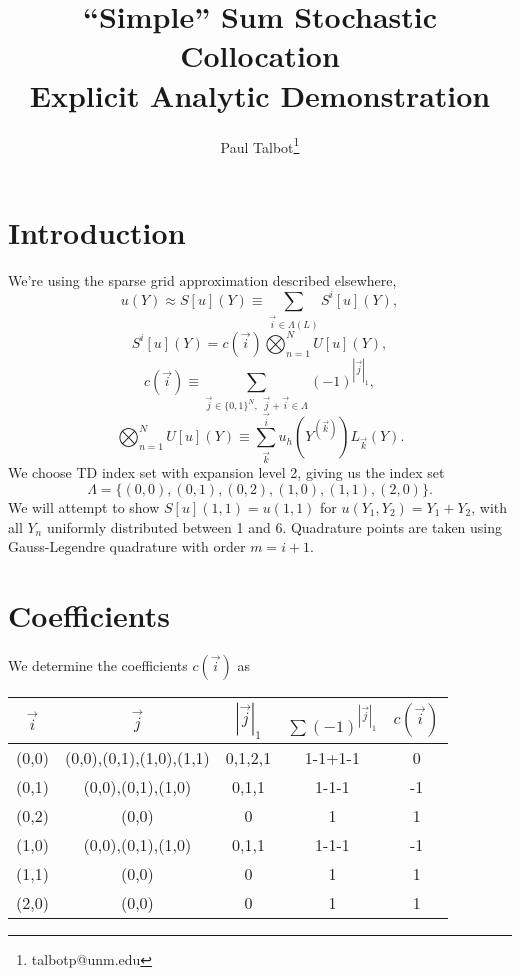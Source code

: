 \documentclass[11pt]{article}
\begin{document}
\title{``Simple'' Sum Stochastic Collocation \\Explicit Analytic Demonstration}

\author[]{Paul Talbot\thanks{talbotp@unm.edu}}
\renewcommand\Authands{ and }
\maketitle
\newpage
\section{Introduction}
We're using the sparse grid approximation described elsewhere,
\begin{equation}
u(Y)\approx S[u](Y)\equiv \sum_{\vec i\in\Lambda(L)} S^i[u](Y),
\end{equation}
\begin{equation}
 S^i[u](Y) = c(\vec i)\bigotimes_{n=1}^N U[u](Y),
\end{equation}
\begin{equation}
c(\vec i)\equiv \sum_{\vec j\in\{0,1\}^N,\hspace{5pt}\vec j+\vec i \in \Lambda} (-1)^{|\vec j|_1},
\end{equation}
\begin{equation}
\bigotimes_{n=1}^N U[u](Y)\equiv \sum_{\vec k}^{\vec i} u_h(Y^{(\vec k)}) L_{\vec k}(Y).
\end{equation}
We choose TD index set with expansion level 2, giving us the index set
\begin{equation}
\Lambda=\{(0,0),(0,1),(0,2),(1,0),(1,1),(2,0)\}.
\end{equation}
We will attempt to show $S[u](1,1)=u(1,1)$ for $u(Y_1,Y_2)=Y_1+Y_2$, with all $Y_n$ uniformly distributed between 1 and 6.  Quadrature points are taken using Gauss-Legendre quadrature with order $m=i+1$.

\section{Coefficients}
We determine the coefficients $c(\vec i)$ as
\begin{table}[H]
\centering
\begin{tabular}{c|c c c|c}
$\vec i$ & $\vec j$ & $|\vec j|_1$ & $\sum(-1)^{|\vec j|_1}$ & $c(\vec{i})$ \\ \hline
(0,0) & (0,0),(0,1),(1,0),(1,1) & 0,1,2,1 & 1-1+1-1 & 0 \\
(0,1) & (0,0),(0,1),(1,0) & 0,1,1 & 1-1-1 & -1 \\
(0,2) & (0,0) & 0 & 1 & 1 \\
(1,0) & (0,0),(0,1),(1,0) & 0,1,1 & 1-1-1 & -1 \\
(1,1) & (0,0) & 0 & 1 & 1 \\
(2,0) & (0,0) & 0 & 1 & 1
\end{tabular}
\end{table}
\end{document}
